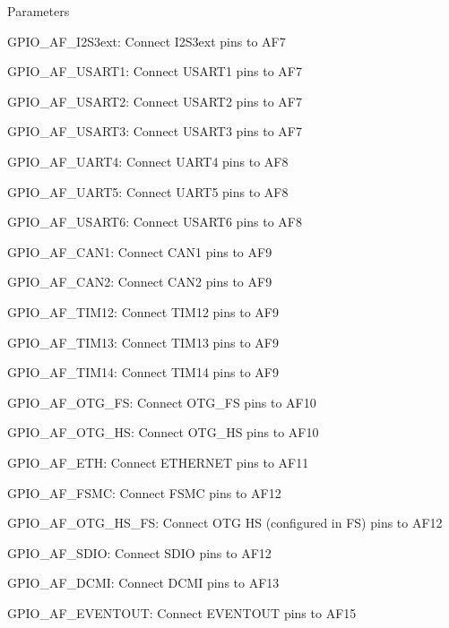 \begin{DoxyParams}{Parameters}
\begin{DoxyItemize}
\item G\+P\+I\+O\+\_\+\+A\+F\+\_\+\+I2\+S3ext\+: Connect I2\+S3ext pins to A\+F7 \item G\+P\+I\+O\+\_\+\+A\+F\+\_\+\+U\+S\+A\+R\+T1\+: Connect U\+S\+A\+R\+T1 pins to A\+F7 \item G\+P\+I\+O\+\_\+\+A\+F\+\_\+\+U\+S\+A\+R\+T2\+: Connect U\+S\+A\+R\+T2 pins to A\+F7 \item G\+P\+I\+O\+\_\+\+A\+F\+\_\+\+U\+S\+A\+R\+T3\+: Connect U\+S\+A\+R\+T3 pins to A\+F7 \item G\+P\+I\+O\+\_\+\+A\+F\+\_\+\+U\+A\+R\+T4\+: Connect U\+A\+R\+T4 pins to A\+F8 \item G\+P\+I\+O\+\_\+\+A\+F\+\_\+\+U\+A\+R\+T5\+: Connect U\+A\+R\+T5 pins to A\+F8 \item G\+P\+I\+O\+\_\+\+A\+F\+\_\+\+U\+S\+A\+R\+T6\+: Connect U\+S\+A\+R\+T6 pins to A\+F8 \item G\+P\+I\+O\+\_\+\+A\+F\+\_\+\+C\+A\+N1\+: Connect C\+A\+N1 pins to A\+F9 \item G\+P\+I\+O\+\_\+\+A\+F\+\_\+\+C\+A\+N2\+: Connect C\+A\+N2 pins to A\+F9 \item G\+P\+I\+O\+\_\+\+A\+F\+\_\+\+T\+I\+M12\+: Connect T\+I\+M12 pins to A\+F9 \item G\+P\+I\+O\+\_\+\+A\+F\+\_\+\+T\+I\+M13\+: Connect T\+I\+M13 pins to A\+F9 \item G\+P\+I\+O\+\_\+\+A\+F\+\_\+\+T\+I\+M14\+: Connect T\+I\+M14 pins to A\+F9 \item G\+P\+I\+O\+\_\+\+A\+F\+\_\+\+O\+T\+G\+\_\+\+FS\+: Connect O\+T\+G\+\_\+\+FS pins to A\+F10 \item G\+P\+I\+O\+\_\+\+A\+F\+\_\+\+O\+T\+G\+\_\+\+HS\+: Connect O\+T\+G\+\_\+\+HS pins to A\+F10 \item G\+P\+I\+O\+\_\+\+A\+F\+\_\+\+E\+TH\+: Connect E\+T\+H\+E\+R\+N\+ET pins to A\+F11 \item G\+P\+I\+O\+\_\+\+A\+F\+\_\+\+F\+S\+MC\+: Connect F\+S\+MC pins to A\+F12 \item G\+P\+I\+O\+\_\+\+A\+F\+\_\+\+O\+T\+G\+\_\+\+H\+S\+\_\+\+FS\+: Connect O\+TG HS (configured in FS) pins to A\+F12 \item G\+P\+I\+O\+\_\+\+A\+F\+\_\+\+S\+D\+IO\+: Connect S\+D\+IO pins to A\+F12 \item G\+P\+I\+O\+\_\+\+A\+F\+\_\+\+D\+C\+MI\+: Connect D\+C\+MI pins to A\+F13 \item G\+P\+I\+O\+\_\+\+A\+F\+\_\+\+E\+V\+E\+N\+T\+O\+UT\+: Connect E\+V\+E\+N\+T\+O\+UT pins to A\+F15 \end{DoxyItemize}
\\
\hline
\end{DoxyParams}

